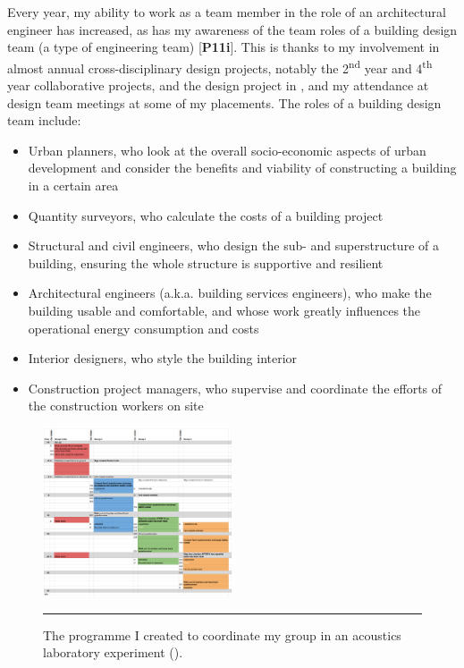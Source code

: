Every year, my ability to work as a team member in the role of an architectural engineer has increased, as has my awareness of the team roles of a building design team (a type of engineering team) [\textbf{P11i}].
This is thanks to my involvement in almost annual cross-disciplinary design projects, notably the 2\textsuperscript{nd} year and 4\textsuperscript{th} year collaborative projects, and the design project in \CASTitle, and my attendance at design team meetings at some of my placements.
The roles of a building design team include:
\begin{itemize}
    \item Urban planners, who look at the overall socio-economic aspects of urban development and consider the benefits and viability of constructing a building in a certain area
    \item Quantity surveyors, who calculate the costs of a building project
    \item Structural and civil engineers, who design the sub- and superstructure of a building, ensuring the whole structure is supportive and resilient
    \item Architectural engineers (a.k.a. building services engineers), who make the building usable and comfortable, and whose work greatly influences the operational energy consumption and costs
    \item Interior designers, who style the building interior
    \item Construction project managers, who supervise and coordinate the efforts of the construction workers on site
\end{itemize}


\begin{figure}[htbp]
	\centering
	\includegraphics[width=0.5\textwidth]{figures/lab-gantt.PNG}
	\rule{\textwidth}{0.5pt} %
	\caption[Acoustics experiment programme.]{The programme I created to coordinate my group in an acoustics laboratory experiment (\LAB).}
	\label{fig:lab-gantt}
\end{figure}



